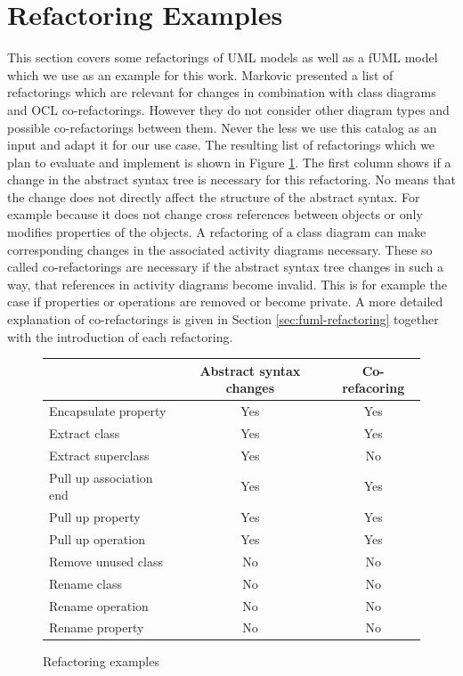 \documentclass{llncs}
\begin{document}


\section{Refactoring Examples}
\label{refactoring-examples}

This section covers some refactorings of UML models as well as a fUML model which we use as an example for this work. 
Markovic \cite{DBLP:journals/sosym/MarkovicB08} presented a list of refactorings which are relevant for changes in 
combination with class 
diagrams and OCL co-refactorings. However they do not consider other diagram types and possible co-refactorings between 
them. Never the less we use this catalog as an input and adapt it for our use case. The resulting list of 
refactorings which we plan to evaluate and implement is shown in Figure \ref{fig:refactoringlist}. The first column shows 
if a change in the abstract syntax tree is necessary for this refactoring. No means that the change does not directly 
affect the structure of the abstract syntax. For example because it does not change cross references between objects or 
only modifies properties of the objects. A refactoring of a class 
diagram can make corresponding changes in the associated activity diagrams necessary. These so called co-refactorings are 
necessary if the abstract syntax tree changes in such a way, that references in activity diagrams become invalid. This is 
for example the case if properties or operations are removed or become private. A more detailed explanation of
co-refactorings is given in Section \ref{sec:fuml-refactoring} together with the introduction of each refactoring.

\begin{figure}[h!t]
 \centering
 \begin{tabular}[]{l | c | c}
  & Abstract syntax changes & Co-refacoring\\
  \hline
  Encapsulate property & Yes & Yes\\
  Extract class & Yes & Yes\\
  Extract superclass & Yes & No\\
  Pull up association end & Yes & Yes\\
  Pull up property & Yes & Yes\\
  Pull up operation & Yes & Yes\\
  Remove unused class & No & No\\
  Rename class & No & No\\
  Rename operation & No & No\\
  Rename property & No & No\\
 \end{tabular}
 \caption{Refactoring examples}
 \label{fig:refactoringlist}
\end{figure}
\end{document}
